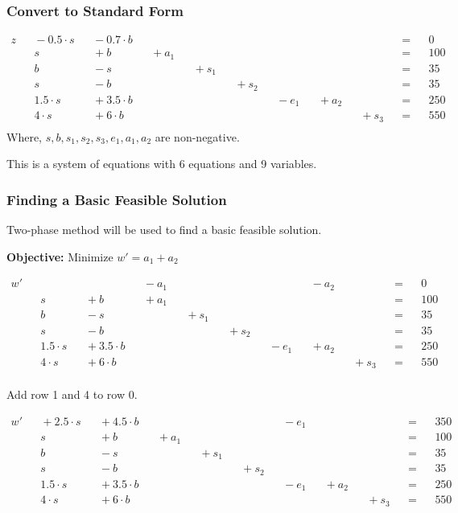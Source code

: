 \documentclass{article}
\begin{document}
\subsubsection{Convert to Standard Form}
\begin{align*}
    z &&{}- 0.5 \cdot s&&{}- 0.7 \cdot b&&&&&&&&&&&&&&=&&0\\
    &&s&&{}+ b&&{}+a_1&&&&&&&&&&&&=&&100\\
    &&b&&{}- s&&&&{}+ s_1&&&&&&&&&&=&&35\\
    &&s&&{}- b&&&&&&{}+ s_2&&&&&&&&=&&35\\
    &&1.5 \cdot s&&{}+ 3.5 \cdot b&&&&&&&&{}- e_1&&{}+a_2&&&& = &&250\\
    &&4 \cdot s&&{}+ 6 \cdot b&&&&&&&&&&&&{}+ s_3&& = &&550\\
\end{align*}
Where, $s, b, s_1, s_2, s_3, e_1, a_1, a_2$ are non-negative.

This is a system of equations with 6 equations and 9 variables.


\subsubsection{Finding a Basic Feasible Solution}
Two-phase method will be used to find a basic feasible solution.

\textbf{Objective:} Minimize $w' = a_1 + a_2$

\begin{align*}
    w' &&&&&&{}-a_1&&&&&&&&{}- a_2&&&&=&&0\\
    &&s&&{}+ b&&{}+a_1&&&&&&&&&&&&=&&100\\
    &&b&&{}- s&&&&{}+ s_1&&&&&&&&&&=&&35\\
    &&s&&{}- b&&&&&&{}+ s_2&&&&&&&&=&&35\\
    &&1.5 \cdot s&&{}+ 3.5 \cdot b&&&&&&&&{}- e_1&&{}+a_2&&&& = &&250\\
    &&4 \cdot s&&{}+ 6 \cdot b&&&&&&&&&&&&{}+ s_3&& = &&550\\
\end{align*}

Add row 1 and 4 to row 0.

\begin{align*}
    w' &&{}+2.5 \cdot s&&{}+ 4.5 \cdot b&&&&&&&&{}- e_1&&&&&&=&&350\\
    &&s&&{}+ b&&{}+a_1&&&&&&&&&&&&=&&100\\
    &&b&&{}- s&&&&{}+ s_1&&&&&&&&&&=&&35\\
    &&s&&{}- b&&&&&&{}+ s_2&&&&&&&&=&&35\\
    &&1.5 \cdot s&&{}+ 3.5 \cdot b&&&&&&&&{}- e_1&&{}+a_2&&&& = &&250\\
    &&4 \cdot s&&{}+ 6 \cdot b&&&&&&&&&&&&{}+ s_3&& = &&550\\
\end{align*}
\end{document}
